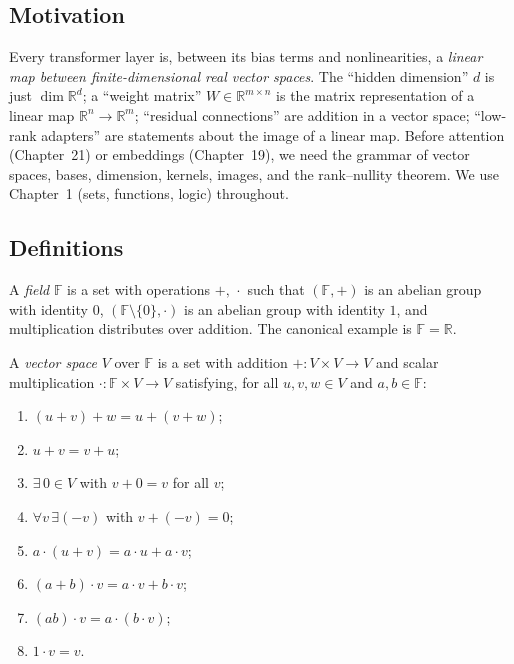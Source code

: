 \subsection*{Motivation}

Every transformer layer is, between its bias terms and nonlinearities, a \emph{linear map between finite-dimensional real vector spaces}. The ``hidden dimension'' $d$ is just $\dim \mathbb{R}^d$; a ``weight matrix'' $W \in \mathbb{R}^{m \times n}$ is the matrix representation of a linear map $\mathbb{R}^n \to \mathbb{R}^m$; ``residual connections'' are addition in a vector space; ``low-rank adapters'' are statements about the image of a linear map. Before attention (Chapter~21) or embeddings (Chapter~19), we need the grammar of vector spaces, bases, dimension, kernels, images, and the rank--nullity theorem. We use Chapter~1 (sets, functions, logic) throughout.

\subsection*{Definitions}

\begin{definition}[Field]
A \emph{field} $\mathbb{F}$ is a set with operations $+,\,\cdot$ such that $(\mathbb{F},+)$ is an abelian group with identity $0$, $(\mathbb{F}\setminus\{0\},\cdot)$ is an abelian group with identity $1$, and multiplication distributes over addition. The canonical example is $\mathbb{F} = \mathbb{R}$.
\end{definition}

\begin{definition}
A \emph{vector space} $V$ over $\mathbb{F}$ is a set with addition $+\colon V\times V\to V$ and scalar multiplication $\cdot\colon \mathbb{F}\times V\to V$ satisfying, for all $u,v,w\in V$ and $a,b\in\mathbb{F}$:
\begin{enumerate}
  \item $(u+v)+w = u+(v+w)$;
  \item $u+v = v+u$;
  \item $\exists\, 0 \in V$ with $v+0=v$ for all $v$;
  \item $\forall v\,\exists (-v)$ with $v+(-v)=0$;
  \item $a\cdot(u+v) = a\cdot u + a\cdot v$;
  \item $(a+b)\cdot v = a\cdot v + b\cdot v$;
  \item $(ab)\cdot v = a\cdot(b\cdot v)$;
  \item $1\cdot v = v$.
\end{enumerate}
\end{definition}

